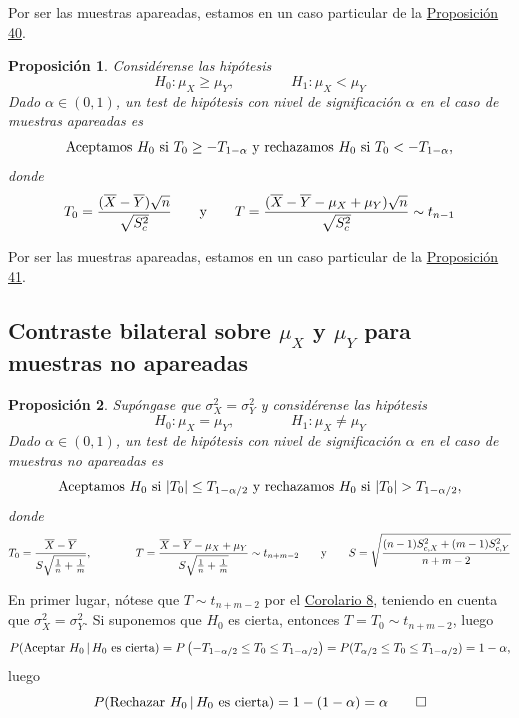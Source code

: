 \documentclass[11pt]{report}
\makeatletter
\renewenvironment{proof}[1][\proofname]{\par
  \pushQED{\qed}%
  \normalfont \topsep\z@skip %
  \trivlist
  \item[\hskip\labelsep
        \itshape
    #1\@addpunct{.}]\ignorespaces
}{%
  \popQED\endtrivlist\@endpefalse
}
\newtheorem{proposition}{Proposición}
\theoremstyle{definition}
\makeatother
\begin{document}
\begin{proof}
    Por ser las muestras apareadas, estamos en un caso particular de la \hyperref[prop40]{\color{blue}Proposición 40}.
\end{proof}

\begin{proposition}
    Considérense las hipótesis
    \[H_0 \colon \mu_X \geq \mu_Y, \qquad \qquad H_1 \colon \mu_X < \mu_Y\]
    Dado $\alpha \in (0,1)$, un test de hipótesis con nivel de significación $\alpha$ en el caso de muestras apareadas es
    \[\textup{{Aceptamos} } H_0 \textup{ {si} } T_0 \geq -T_{1-\alpha} \textup{ {y rechazamos} } H_0 \textup{ {si} } T_0 < -T_{1-\alpha},\]
    donde
    \[T_0 = \frac{(\overline{X}-\overline{Y})\sqrt{n}}{\sqrt{S^2_c}} \qquad \textup{y} \qquad T = \frac{(\overline{X}-\overline{Y}-\mu_X+\mu_Y)\sqrt{n}}{\sqrt{S^2_c}} \sim t_{n-1}\]
\end{proposition}

\begin{proof}
    Por ser las muestras apareadas, estamos en un caso particular de la \hyperref[prop41]{\color{blue}Proposición 41}.
\end{proof}

\subsection{Contraste bilateral sobre \texorpdfstring{$\mu_X$}{TEXT} y \texorpdfstring{$\mu_Y$}{TEXT} para muestras no apareadas}


\begin{proposition}
    Supóngase que $\sigma^2_X = \sigma^2_Y$ y considérense las hipótesis
    \[H_0 \colon \mu_X=\mu_Y, \qquad \qquad H_1 \colon \mu_X\neq \mu_Y\]
    Dado $\alpha \in (0,1)$, un test de hipótesis con nivel de significación $\alpha$ en el caso de muestras no apareadas es
    \[\textup{{Aceptamos} } H_0 \textup{ {si} } |T_0| \leq T_{1-\alpha/2} \textup{ {y rechazamos} } H_0 \textup{ {si} } |T_0| > T_{1-\alpha/2},\]
    donde
    \[T_0= \frac{\overline{X}-\overline{Y}}{S\sqrt{\frac{1}{n}+\frac{1}{m}}}, \qquad \qquad T = \frac{\overline{X}-\overline{Y}-\mu_X+\mu_Y}{S\sqrt{\frac{1}{n}+\frac{1}{m}}} \sim t_{n+m-2} \qquad \textup{y} \qquad S = \sqrt{\frac{(n-1)S^2_{c,X}+(m-1)S^2_{c,Y}}{n+m-2}}\]
\end{proposition}

\begin{proof}
    En primer lugar, nótese que $T \sim t_{n+m-2}$ por el \hyperref[cor8]{\color{blue}Corolario 8}, teniendo en cuenta que $\sigma^2_X = \sigma^2_Y$. Si suponemos que $H_0$ es cierta, entonces $T = T_0 \sim t_{n+m-2}$, luego
    \[P(\textup{Aceptar } H_0 \, | \, H_0 \textup{ es cierta}) = P\left(-T_{1-\alpha/2} \leq T_0 \leq T_{1-\alpha/2}\right) = P(T_{\alpha/2} \leq T_0 \leq T_{1-\alpha/2}) = 1-\alpha,\]
    luego
    \[P(\textup{Rechazar } H_0 \, | \, H_0 \textup{ es cierta}) = 1-(1-\alpha) = \alpha \qedhere\]
\end{proof}
\end{document}

